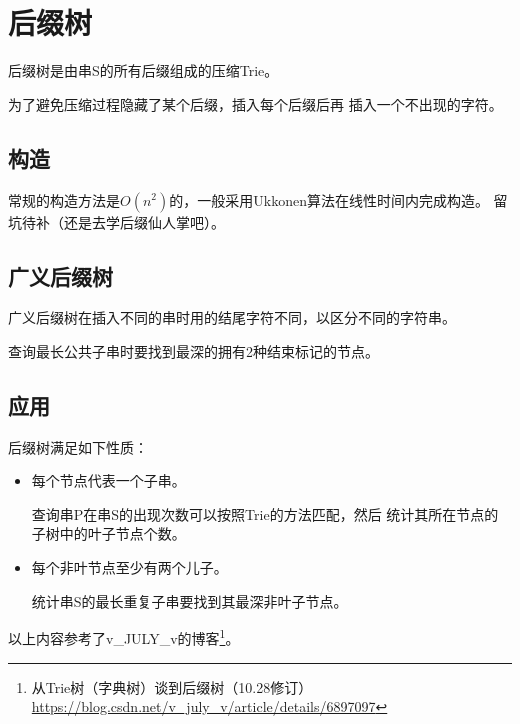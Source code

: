 \section{后缀树}
后缀树是由串S的所有后缀组成的压缩Trie。

为了避免压缩过程隐藏了某个后缀，插入每个后缀后再
插入一个不出现的字符。
\subsection{构造}
常规的构造方法是$O(n^2)$的，一般采用Ukkonen算法在线性时间内完成构造。
留坑待补（还是去学后缀仙人掌吧）。
\subsection{广义后缀树}
广义后缀树在插入不同的串时用的结尾字符不同，以区分不同的字符串。

查询最长公共子串时要找到最深的拥有2种结束标记的节点。
\subsection{应用}
后缀树满足如下性质：
\begin{itemize}
    \item 每个节点代表一个子串。

    查询串P在串S的出现次数可以按照Trie的方法匹配，然后
    统计其所在节点的子树中的叶子节点个数。
    \item 每个非叶节点至少有两个儿子。

    统计串S的最长重复子串要找到其最深非叶子节点。
\end{itemize}
以上内容参考了v\_JULY\_v的博客\footnote{
	从Trie树（字典树）谈到后缀树（10.28修订）
	\url{https://blog.csdn.net/v\_july\_v/article/details/6897097}
}。
